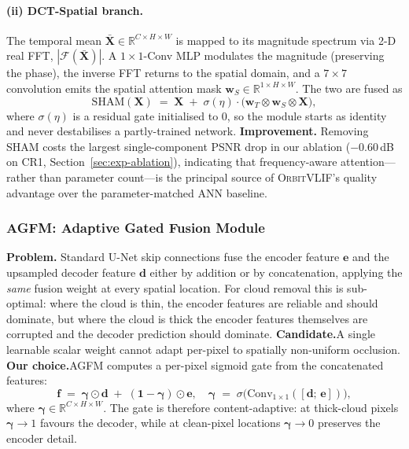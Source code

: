 \documentclass[conference]{IEEEtran}
\newcommand{\R}{\mathbb{R}}
\newcommand{\OrbitVLIF}{\textsc{OrbitVLIF}}
\newcommand{\SHAM}{\textsc{SHAM}}
\newcommand{\AGFM}{\textsc{AGFM}}
\begin{document}
\paragraph{(ii) DCT-Spatial branch.}
The temporal mean
$\bar{\mathbf{X}}\!\in\!\R^{C\times H\times W}$ is mapped to its
magnitude spectrum via 2-D real FFT,
$|\mathcal{F}(\bar{\mathbf{X}})|$. A $1\!\times\!1$-Conv MLP
modulates the magnitude (preserving the phase), the inverse FFT
returns to the spatial domain, and a $7\!\times\!7$ convolution
emits the spatial attention mask
$\mathbf{w}_S\!\in\!\R^{1\times H\times W}$.
The two are fused as
\begin{equation}
\mathrm{SHAM}(\mathbf{X}) \;=\;
\mathbf{X}\;+\;\sigma(\eta)\!\cdot\!
\big(\mathbf{w}_T\!\otimes\!\mathbf{w}_S\!\otimes\!\mathbf{X}\big),
\label{eq:sham}
\end{equation}
where $\sigma(\eta)$ is a residual gate initialised to $0$, so the
module starts as identity and never destabilises a partly-trained
network. \textbf{Improvement.}\;\;
Removing \SHAM{} costs the largest single-component PSNR drop in
our ablation ($-0.60$\,dB on CR1, Section~\ref{sec:exp-ablation}),
indicating that frequency-aware attention---rather than parameter
count---is the principal source of \OrbitVLIF's quality advantage
over the parameter-matched ANN baseline.


\subsubsection{\AGFM{}: Adaptive Gated Fusion Module}\label{sec:framework-agfm}

\textbf{Problem.}\;\;
Standard U-Net skip connections fuse the encoder feature
$\mathbf{e}$ and the upsampled decoder feature $\mathbf{d}$ either
by addition or by concatenation, applying the \emph{same} fusion
weight at every spatial location. For cloud removal this is
sub-optimal: where the cloud is thin, the encoder features are
reliable and should dominate, but where the cloud is thick the
encoder features themselves are corrupted and the decoder
prediction should dominate. \textbf{Candidate.}\;\;A single
learnable scalar weight cannot adapt per-pixel to spatially
non-uniform occlusion. \textbf{Our choice.}\;\;\AGFM{} computes a
per-pixel sigmoid gate from the concatenated features:
\begin{equation}
\mathbf{f} \;=\;
\boldsymbol{\gamma}\!\odot\!\mathbf{d} \;+\;
(\mathbf{1}\!-\!\boldsymbol{\gamma})\!\odot\!\mathbf{e},\quad
\boldsymbol{\gamma}\;=\;\sigma\!\big(\mathrm{Conv}_{1\!\times\!1}([\mathbf{d};\,\mathbf{e}])\big),
\label{eq:agfm}
\end{equation}
where $\boldsymbol{\gamma}\!\in\!\R^{C\times H\times W}$. The gate
is therefore content-adaptive: at thick-cloud pixels
$\boldsymbol{\gamma}\!\to\!1$ favours the decoder, while at
clean-pixel locations $\boldsymbol{\gamma}\!\to\!0$ preserves the
encoder detail.
\end{document}
